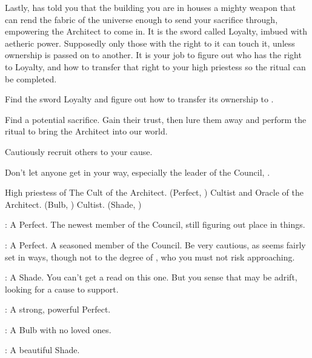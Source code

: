 \documentclass[blue]{Silversiders}
\begin{document}
Lastly, \cWar{} has told you that the building you are in houses a mighty weapon that can rend the fabric of the universe enough to send your sacrifice through, empowering the Architect to come in. It is the sword called Loyalty, imbued with aetheric power. Supposedly only those with the right to it can touch it, unless ownership is passed on to another. It is your job to figure out who has the right to Loyalty, and how to transfer that right to your high priestess so the ritual can be completed.

\begin{itemz}[Goals]
  \item Find the sword Loyalty and figure out how to transfer its ownership to \cWar{}.
  \item Find a potential sacrifice. Gain their trust, then lure them away and perform the ritual to bring the Architect into our world.
  \item Cautiously recruit others to your cause.
  \item Don't let anyone get in your way, especially the leader of the Council, \cDeath{}.
\end{itemz}

\begin{itemz}[Greensheets]
  \item \gSummoning{}
\end{itemz}

\begin{members}
	\member{\cWar{}} High priestess of The Cult of the Architect. (Perfect, \cWar{\Sex})
	\member{\cOracle{}} Cultist and Oracle of the Architect. (Bulb, \cOracle{\Sex})
	\member{\cTrickster{}} Cultist. (Shade, \cTrickster{\Sex})
	
\end{members}

\begin{itemz}
	\item \cFamine{}: A \cFamine{\sex} Perfect. The newest member of the Council, still figuring out \cFamine{\their} place in things.
	\item \cPestilence{}: A \cPestilence{\sex} Perfect. A seasoned member of the Council. Be very cautious, as \cPestilence{} seems fairly set in \cPestilence{\their} ways, though not to the degree of \cDeath{}, who you must not risk approaching.
	\item \cTraitor{}: A \cTraitor{\sex} Shade. You can't get a read on this one. But you sense that \cTraitor{\they} may be adrift, looking for a cause to support.
	
\end{itemz}

\begin{itemz}
	\item \cMuscle{}: A strong, powerful \cMuscle{\sex} Perfect.
	\item \cOutcast{}: A \cOutcast{\sex} Bulb with no loved ones.
	\item \cBeauty{}: A beautiful \cBeauty{\sex} Shade.

\end{itemz}
\end{document}
